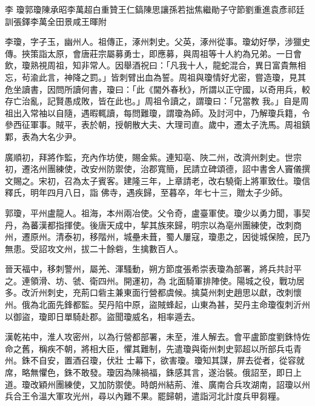 
\begin{pinyinscope}

 李
 瓊郭瓊陳承昭李萬超白重贊王仁鎬陳思讓孫若拙焦繼勛子守節劉重進袁彥祁廷訓張鐸李萬全田景咸王暉附



 李瓊，字子玉，幽州人。祖傳正，涿州刺史。父英，涿州從事。瓊幼好學，涉獵史傳。挾策詣太原，會唐莊宗屬募勇士，即應募，與周祖等十人約為兄弟。一日會飲，瓊熟視周祖，知非常人。因舉酒祝曰：「凡我十人，龍蛇混合，異日富貴無相忘，茍渝此言，神降之罰。」皆刺臂出血為誓。周祖與瓊情好尤密，嘗造瓊，見其危坐讀書，因問所讀何書，瓊曰：「此《閫外春秋》，所謂以正守國，以奇用兵，較存亡治亂，記賢愚成敗，皆在此也。」周祖令讀之，謂瓊曰：「兄當教
 我。」自是周祖出入常袖以自隨，遇暇輒讀，每問難瓊，謂瓊為師。及討河中，乃解瓊兵籍，令參西征軍事。賊平，表於朝，授朝散大夫、大理司直。歲中，遷太子洗馬。周祖鎮鄴，表為大名少尹。



 廣順初，拜將作監，充內作坊使，賜金紫。連知亳、陜二州，改濟州刺史。世宗初，遷洺州團練使，改安州防禦使，治郡寬簡，民請立碑頌德，詔中書舍人竇儀撰文賜之。宋初，召為太子賓客。建隆三年，上章請老，改右驍衛上將軍致仕。瓊信釋氏，明年四月八日，詣
 佛寺，遇疾歸，至暮卒，年七十三，贈太子少師。



 郭瓊，平州盧龍人。祖海，本州兩冶使。父令奇，盧臺軍使。瓊少以勇力聞，事契丹，為蕃漢都指揮使。後唐天成中，挈其族來歸，明宗以為亳州團練使，改刺商州，遷原州。清泰初，移階州，城壘未葺，蜀人屢寇，瓊患之，因徙城保險，民乃無患。受詔攻文州，拔二十餘砦，生擒數百人。



 晉天福中，移刺警州，屬羌、渾騷動，朔方節度張希崇表瓊為部署，將兵共討平之。連領滑、坊、虢、衛四州。開運初，為
 北面騎軍排陣使。陽城之役，戰功居多。改沂州刺史，充荊口砦主兼東面行營都虞候。擒莫州刺史趙思以獻，改刺懷州。俄為北面先鋒都監。契丹陷中原，盜賊蜂起，山東為甚，契丹主命瓊復刺沂州以御盜，瓊即日單騎赴郡。盜聞瓊威名，相率遁去。



 漢乾祐中，淮人攻密州，以為行營都部署，未至，淮人解去。會平盧節度劉銖恃佐命之舊，稱疾不朝，將相大臣，懼其難制，先遣瓊與衛州刺史郭超以所部兵屯青州。銖不自安，置酒召瓊，伏壯
 士幕下，欲害瓊。瓊知其謀，屏去從者，從容就席，略無懼色，銖不敢發。瓊因為陳禍福，銖感其言，遂治裝。俄詔至，即日上道。瓊改穎州團練使，又加防禦使。時朗州結荊、淮、廣南合兵攻湖南，詔瓊以州兵合王令溫大軍攻光州，尋以內難不果。罷歸朝，遣詣河北計度兵甲芻糧。




\end{pinyinscope}
